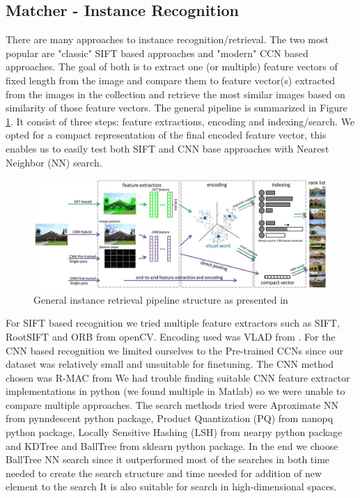 \documentclass{article}
\begin{document}
\subsection{Matcher - Instance Recognition}

There are many approaches to instance recognition/retrieval. 
The two most popular are "classic" SIFT based approaches and "modern" CCN based approaches.
The goal of both is to extract one (or multiple) feature vectors of fixed length from the image and compare them to feature vector(s) extracted from the images in the collection and retrieve the most similar images based on similarity of those feature vectors.
The general pipeline is summarized in Figure \ref{fig:1}.
It consist of three steps: feature extractions, encoding and indexing/search.
We opted for a compact representation of the final encoded feature vector, this enables us to easily test both SIFT and CNN base approaches with Nearest Neighbor (NN) search.

\begin{figure}[H]
    \center
    \includegraphics[scale=0.5]{img/img-rec-pipeline.jpg}
    \caption{General instance retrieval pipeline structure as presented in \cite{overview1}}
    \label{fig:1}
\end{figure}

For SIFT based recognition we tried multiple feature extractors such as SIFT, RootSIFT and ORB from openCV.
Encoding used was VLAD \cite{VLAD} from \cite{VLAD-implementation}.
For the CNN based recognition we limited ourselves to the Pre-trained CCNs since our dataset was relatively small and unsuitable for finetuning.
The CNN method chosen was R-MAC \cite{RMAC} from \cite{RMAC-implementation}
We had trouble finding suitable CNN feature extractor implementations in python (we found multiple in Matlab) so we were unable to compare multiple approaches.
The search methods tried were Aproximate NN from pynndescent python package, Product Quantization (PQ) from nanopq  python package, Locally Sensitive Hashing (LSH) from nearpy python package and KDTree and BallTree from sklearn python package.
In the end we choose BallTree NN search since it outperformed most of the searches in both time needed to create the search structure and time needed for addition of new element to the search
It is also suitable for search in high-dimensional spaces. 
\end{document}
